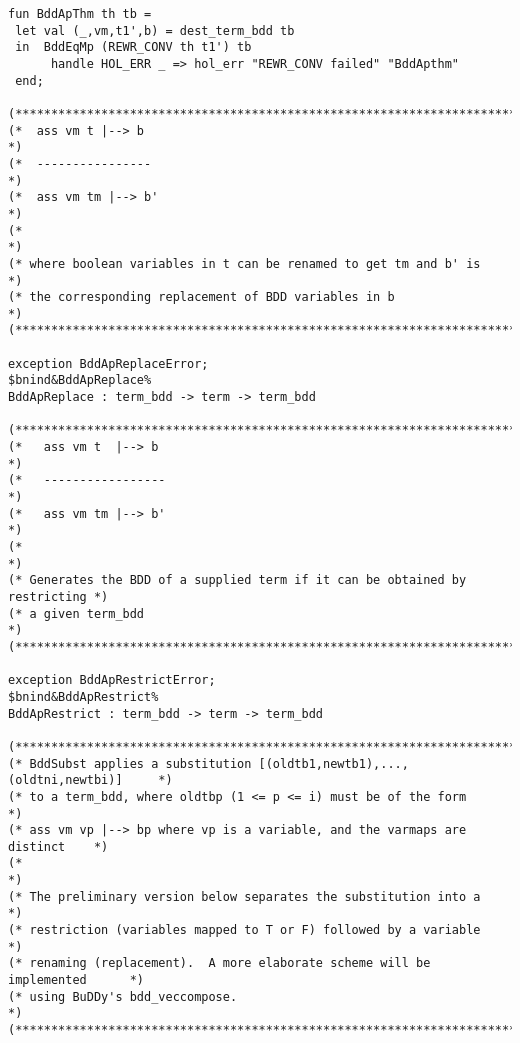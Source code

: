 \documentclass[12pt]{article}
\begin{document}
\begin{footnotesize}
\begin{Verbatim}[commandchars=\$\&\%]
fun BddApThm th tb =
 let val (_,vm,t1',b) = dest_term_bdd tb
 in  BddEqMp (REWR_CONV th t1') tb 
      handle HOL_ERR _ => hol_err "REWR_CONV failed" "BddApthm"
 end;

(*****************************************************************************)
(*  ass vm t |--> b                                                          *)
(*  ----------------                                                         *)
(*  ass vm tm |--> b'                                                        *)
(*                                                                           *)
(* where boolean variables in t can be renamed to get tm and b' is           *)
(* the corresponding replacement of BDD variables in b                       *)
(*****************************************************************************)

exception BddApReplaceError;
$bnind&BddApReplace%
BddApReplace : term_bdd -> term -> term_bdd

(*****************************************************************************)
(*   ass vm t  |--> b                                                        *)
(*   -----------------                                                       *)
(*   ass vm tm |--> b'                                                       *)
(*                                                                           *)
(* Generates the BDD of a supplied term if it can be obtained by restricting *)
(* a given term_bdd                                                          *)
(*****************************************************************************)

exception BddApRestrictError;
$bnind&BddApRestrict%
BddApRestrict : term_bdd -> term -> term_bdd

(*****************************************************************************)
(* BddSubst applies a substitution [(oldtb1,newtb1),...,(oldtni,newtbi)]     *)
(* to a term_bdd, where oldtbp (1 <= p <= i) must be of the form             *)
(* ass vm vp |--> bp where vp is a variable, and the varmaps are distinct    *)
(*                                                                           *)
(* The preliminary version below separates the substitution into a           *)
(* restriction (variables mapped to T or F) followed by a variable           *)
(* renaming (replacement).  A more elaborate scheme will be implemented      *)
(* using BuDDy's bdd_veccompose.                                             *)
(*****************************************************************************)


\end{Verbatim}
\end{footnotesize}
\end{document}
